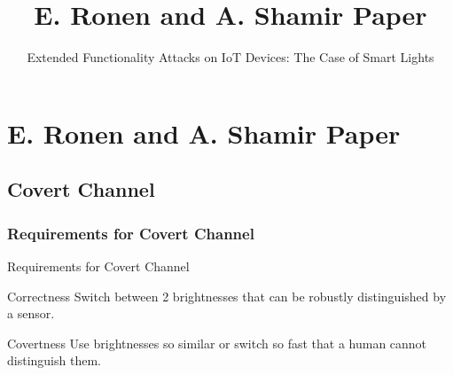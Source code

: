 \documentclass[11pt,t,usepdftitle=false,aspectratio=169]{beamer}
\begin{document}
\title{E. Ronen and A. Shamir Paper}
\subtitle{Extended Functionality Attacks on IoT Devices: The Case of Smart Lights}
\section{E. Ronen and A. Shamir Paper}

\subsection{Covert Channel}%
\label{sub:covert_channel}

\subsubsection{Requirements for Covert Channel}%
\label{sub:requirements_for_covert_channel}
\begin{frame}{Requirements for Covert Channel}
	\begin{block}{Correctness}
		Switch between 2 brightnesses that can be robustly distinguished by a sensor.
	\end{block}
	\begin{block}{Covertness}
		Use brightnesses so similar or switch so fast that a human cannot distinguish them.
	\end{block}
	

\end{frame}
\end{document}
